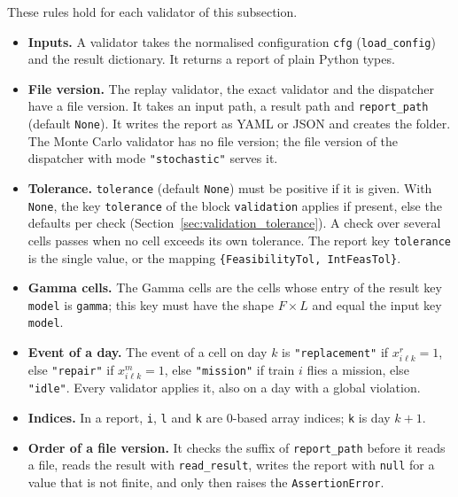 These rules hold for each validator of this subsection.
\begin{itemize}[nosep]
  \item \textbf{Inputs.} A validator takes the normalised configuration \texttt{cfg} (\texttt{load\_config}) and the result dictionary. It returns a report of plain Python types.
  \item \textbf{File version.} The replay validator, the exact validator and the dispatcher have a file version. It takes an input path, a result path and \texttt{report\_path} (default \texttt{None}). It writes the report as YAML or JSON and creates the folder. The Monte Carlo validator has no file version; the file version of the dispatcher with mode \texttt{"stochastic"} serves it.
  \item \textbf{Tolerance.} \texttt{tolerance} (default \texttt{None}) must be positive if it is given. With \texttt{None}, the key \texttt{tolerance} of the block \texttt{validation} applies if present, else the defaults per check (Section~\ref{sec:validation_tolerance}). A check over several cells passes when no cell exceeds its own tolerance. The report key \texttt{tolerance} is the single value, or the mapping \texttt{\{FeasibilityTol, IntFeasTol\}}.
  \item \textbf{Gamma cells.} The Gamma cells are the cells whose entry of the result key \texttt{model} is \texttt{gamma}; this key must have the shape $F \times L$ and equal the input key \texttt{model}.
  \item \textbf{Event of a day.} The event of a cell on day $k$ is \texttt{"replacement"} if $x^r_{i\ell k} = 1$, else \texttt{"repair"} if $x^m_{i\ell k} = 1$, else \texttt{"mission"} if train $i$ flies a mission, else \texttt{"idle"}. Every validator applies it, also on a day with a global violation.
  \item \textbf{Indices.} In a report, \texttt{i}, \texttt{l} and \texttt{k} are 0-based array indices; \texttt{k} is day $k+1$.
  \item \textbf{Order of a file version.} It checks the suffix of \texttt{report\_path} before it reads a file, reads the result with \texttt{read\_result}, writes the report with \texttt{null} for a value that is not finite, and only then raises the \texttt{AssertionError}.
\end{itemize}

\tabend

